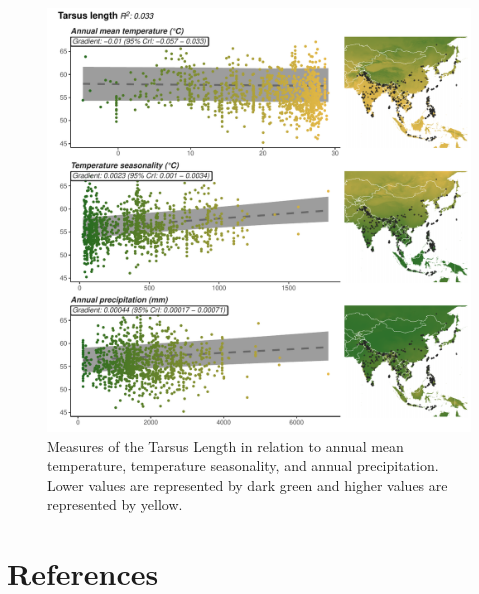 \documentclass[10pt,a4paper]{article}
\begin{document}
\begin{figure}
\includegraphics[width=0.9\linewidth]{../Figures/climMap_Tarsus.length} \caption{Measures of the Tarsus Length in relation to annual mean temperature, temperature seasonality, and annual precipitation. Lower values are represented by dark green and higher values are represented by yellow.}\label{fig:climateComparisonMapTL}
\end{figure}

\clearpage

\section*{References}\label{references}
\end{document}
